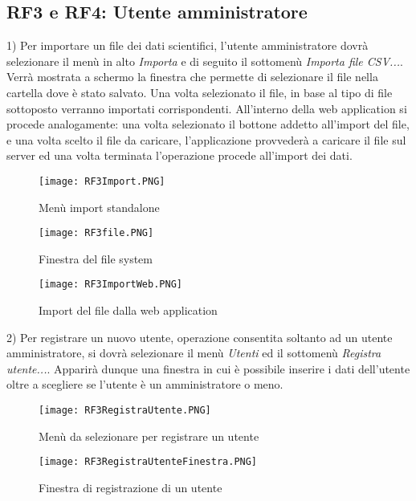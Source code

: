 \documentclass[12pt,a4paper,onecolumn,x11names]{article}
\begin{document}
	\subsection{RF3 e RF4: Utente amministratore}
		\begin{flushleft}
			1) Per importare un file dei dati scientifici, l'utente amministratore dovrà selezionare il menù in alto \textit{Importa} e di seguito il sottomenù \textit{Importa file CSV...}. Verrà mostrata a schermo la finestra che permette di selezionare il file nella cartella dove è stato salvato. Una volta selezionato il file, in base al tipo di file sottoposto verranno importati corrispondenti.\newline
			All'interno della web application si procede analogamente: una volta selezionato il bottone addetto all'import del file, e una volta scelto il file da caricare, l'applicazione provvederà a caricare il file sul server ed una volta terminata l'operazione procede all'import dei dati.
			\begin{figure}[!h]
				\centering
				\begin{minipage}[c]{.45\textwidth}
					\texttt{[image: RF3Import.PNG]}
					\caption{Menù import standalone}
				\end{minipage}%
				\centering
				\begin{minipage}[c]{.45\textwidth}
					\texttt{[image: RF3file.PNG]}
					\caption{Finestra del file system}
				\end{minipage}%
			\end{figure}
			\begin{figure}[h]
				\centering
				\texttt{[image: RF3ImportWeb.PNG]}
				\caption{Import del file dalla web application}
			\end{figure}
		\end{flushleft}
		\begin{flushleft}
			2) Per registrare un nuovo utente, operazione consentita soltanto ad un utente amministratore, si dovrà selezionare il menù \textit{Utenti} ed il sottomenù \textit{Registra utente...}. Apparirà dunque una finestra in cui è possibile inserire i dati dell'utente oltre a scegliere se l'utente è un amministratore o meno.
		\end{flushleft}
		\begin{figure}[!h]
			\centering
			\begin{minipage}[c]{.45\textwidth}
				\texttt{[image: RF3RegistraUtente.PNG]}
				\caption{Menù da selezionare per registrare un utente}
			\end{minipage}%
			\centering
			\begin{minipage}[c]{.45\textwidth}
				\texttt{[image: RF3RegistraUtenteFinestra.PNG]}
				\caption{Finestra di registrazione di un utente}
			\end{minipage}%
		\end{figure}
\newpage
\end{document}
